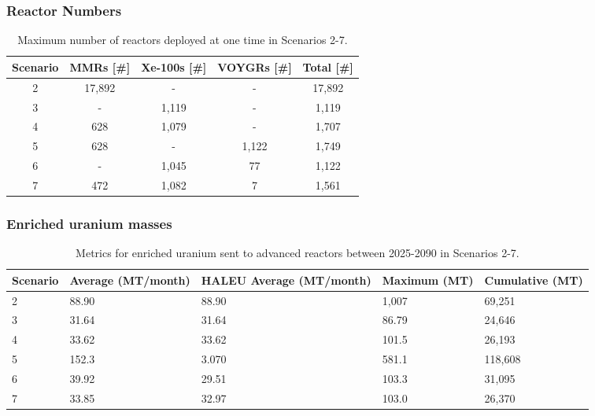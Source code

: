 \begin{frame}
    \frametitle{Reactor Numbers}
    \begin{table}
        \centering 
        \caption{Maximum number of reactors deployed at one time in 
        Scenarios 2-7.}
        \label{tab:reactors_nogrowth}
        \begin{tabular}{c c c c c}
            \hline
            Scenario & \glspl{MMR} [\#] & Xe-100s [\#] & VOYGRs [\#] 
            & Total [\#]\\\hline
            2 & 17,892 & - & - & 17,892\\
            3 & - & 1,119 & - & 1,119\\
            4 & 628 & 1,079 & - & 1,707\\
            5 & 628 & - & 1,122 & 1,749\\
            6 & - & 1,045 & 77 & 1,122\\
            7 & 472 & 1,082 & 7 & 1,561\\
            \hline
        \end{tabular}
    \end{table}
\end{frame}

\begin{frame}
    \frametitle{Enriched uranium masses}
    \begin{table}
        \centering 
        \caption{Metrics for enriched uranium sent to advanced 
        reactors between 2025-2090 in Scenarios 2-7.}
        \label{tab:nogrowth_uranium}
        \begin{tabular}{l p{2cm} p{2cm} p{2cm} p{2cm}}
            \hline
            Scenario & Average (MT/month) & \gls{HALEU} Average 
            (MT/month) & Maximum (MT)& Cumulative (MT)\\\hline
            2 & 88.90 & 88.90 & 1,007 & 69,251\\
            3 & 31.64 & 31.64 & 86.79 & 24,646\\
            4 & 33.62 & 33.62 & 101.5 & 26,193\\
            5 & 152.3 & 3.070 & 581.1 & 118,608\\
            6 & 39.92 & 29.51 & 103.3 & 31,095\\
            7 & 33.85 & 32.97 & 103.0 & 26,370\\
            \hline
        \end{tabular}
    \end{table}
\end{frame}

